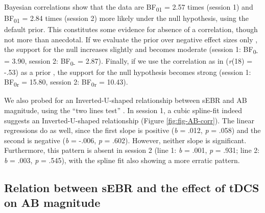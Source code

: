 \documentclass[11pt,]{memoir}
\begin{document}
Bayesian correlations show that the data are BF\textsubscript{01} = 2.57 times (session 1) and BF\textsubscript{01} = 2.84 times (session 2) more likely under the null hypothesis, using the default prior. This constitutes some evidence for absence of a correlation, though not more than anecdotal. If we evaluate the prior over negative effect sizes only \autocite[based on the negative correlation in][]{Colzato2008}, the support for the null increases slightly and becomes moderate (session 1: BF\textsubscript{0-} = 3.90, session 2: BF\textsubscript{0-} = 2.87). Finally, if we use the correlation as in \textcite{Colzato2008} (\emph{r}(18) = -.53) as a prior \autocite{Wagenmakers2016}, the support for the null hypothesis becomes strong (session 1: BF\textsubscript{0r} = 15.80, session 2: BF\textsubscript{0r} = 10.43).

We also probed for an Inverted-U-shaped relationship between sEBR and AB magnitude, using the ``two lines test'' \autocite{Simonsohn2018}. In session 1, a cubic spline-fit indeed suggests an Inverted-U-shaped relationship (Figure \ref{fig:fig-AB-corr}). The linear regressions do as well, since the first slope is positive (\emph{b} = .012, \emph{p} = .058) and the second is negative (\emph{b} = -.006, \emph{p} = .602). However, neither slope is significant. Furthermore, this pattern is absent in session 2 (line 1: \emph{b} = .001, \emph{p} = .931; line 2: \emph{b} = .003, \emph{p} = .545), with the spline fit also showing a more erratic pattern.

\hypertarget{relation-between-sebr-and-the-effect-of-tdcs-on-ab-magnitude-1}{%
\subsection{Relation between sEBR and the effect of tDCS on AB magnitude}\label{relation-between-sebr-and-the-effect-of-tdcs-on-ab-magnitude-1}}
\end{document}
